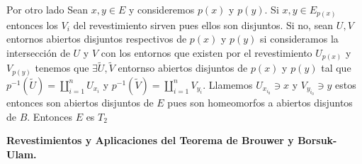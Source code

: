 \documentclass[11pt]{article}
\newcommand{\qed}{\nobreak \ifvmode \relax \else
      \ifdim\lastskip<1.5em \hskip-\lastskip
      \hskip1.5em plus0em minus0.5em \fi \nobreak
      \vrule height0.75em width0.5em depth0.25em\fi}
\begin{document}
\begin{enumerate}
Por otro lado Sean $x,y \in E$ y consideremos $p(x)$ y $p(y)$. Si $x,y \in E_{p(x)}$ entonces los $V_i$ del revestimiento sirven pues ellos son disjuntos. Si no, sean $U,V$ entornos abiertos disjuntos respectivos de $p(x)$ y $p(y)$ si consideramos la intersecci\'on de $U$ y $V$ con los entornos que existen por el revestimiento $U_{p(x)}$ y $V_{p(y)}$ tenemos que $\exists \widetilde{U},\widetilde{V}$ entornso abiertos disjuntos de $p(x)$ y $p(y)$ tal que $p^{-1}(\widetilde{U})=\coprod_{i=1}^{n}{U_{x_i}}$ y $p^{-1}(\widetilde{V})=\coprod_{i=1}^{n}{V_{y_i}}$. Llamemos $U_{x_{i_0}} \ni x$ y $V_{y_{i_0}} \ni y$ estos entonces son abiertos disjuntos de $E$ pues son homeomorfos a abiertos disjuntos de $B$. Entonces $E$ es $T_2$ \qed
\end{enumerate}

\begin{center}
{\bf\sffamily Revestimientos y Aplicaciones del Teorema de Brouwer y Borsuk-Ulam.}
\end{center}
\end{document}
